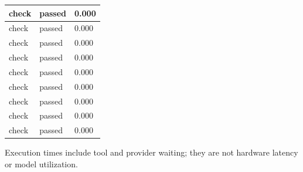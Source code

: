 \documentclass[11pt,a4paper]{article}
\begin{document}
{\begin{longtable}{@{}L{0.57\textwidth}|L{0.16\textwidth}|L{0.17\textwidth}@{}}
check & passed & 0.000\\[2pt]\hline

check & passed & 0.000\\[2pt]\hline

check & passed & 0.000\\[2pt]\hline

check & passed & 0.000\\[2pt]\hline

check & passed & 0.000\\[2pt]\hline

check & passed & 0.000\\[2pt]\hline

check & passed & 0.000\\[2pt]\hline

check & passed & 0.000\\[2pt]\hline

check & passed & 0.000\\[2pt]\hline

\bottomrule\end{longtable}}

Execution times include tool and provider waiting; they are not hardware latency or model utilization.
\end{document}
